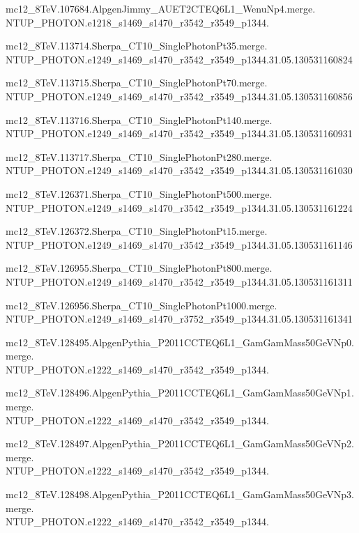 mc12\_8TeV.107684.AlpgenJimmy\_AUET2CTEQ6L1\_WenuNp4.merge. \\NTUP\_PHOTON.e1218\_s1469\_s1470\_r3542\_r3549\_p1344.

mc12\_8TeV.113714.Sherpa\_CT10\_SinglePhotonPt35.merge. \\NTUP\_PHOTON.e1249\_s1469\_s1470\_r3542\_r3549\_p1344.31.05.130531160824

mc12\_8TeV.113715.Sherpa\_CT10\_SinglePhotonPt70.merge. \\NTUP\_PHOTON.e1249\_s1469\_s1470\_r3542\_r3549\_p1344.31.05.130531160856

mc12\_8TeV.113716.Sherpa\_CT10\_SinglePhotonPt140.merge. \\NTUP\_PHOTON.e1249\_s1469\_s1470\_r3542\_r3549\_p1344.31.05.130531160931

mc12\_8TeV.113717.Sherpa\_CT10\_SinglePhotonPt280.merge. \\NTUP\_PHOTON.e1249\_s1469\_s1470\_r3542\_r3549\_p1344.31.05.130531161030

mc12\_8TeV.126371.Sherpa\_CT10\_SinglePhotonPt500.merge. \\NTUP\_PHOTON.e1249\_s1469\_s1470\_r3542\_r3549\_p1344.31.05.130531161224

mc12\_8TeV.126372.Sherpa\_CT10\_SinglePhotonPt15.merge. \\NTUP\_PHOTON.e1249\_s1469\_s1470\_r3542\_r3549\_p1344.31.05.130531161146

mc12\_8TeV.126955.Sherpa\_CT10\_SinglePhotonPt800.merge. \\NTUP\_PHOTON.e1249\_s1469\_s1470\_r3542\_r3549\_p1344.31.05.130531161311

mc12\_8TeV.126956.Sherpa\_CT10\_SinglePhotonPt1000.merge. \\NTUP\_PHOTON.e1249\_s1469\_s1470\_r3752\_r3549\_p1344.31.05.130531161341

mc12\_8TeV.128495.AlpgenPythia\_P2011CCTEQ6L1\_GamGamMass50GeVNp0.merge. \\NTUP\_PHOTON.e1222\_s1469\_s1470\_r3542\_r3549\_p1344.

mc12\_8TeV.128496.AlpgenPythia\_P2011CCTEQ6L1\_GamGamMass50GeVNp1.merge. \\NTUP\_PHOTON.e1222\_s1469\_s1470\_r3542\_r3549\_p1344.

mc12\_8TeV.128497.AlpgenPythia\_P2011CCTEQ6L1\_GamGamMass50GeVNp2.merge. \\NTUP\_PHOTON.e1222\_s1469\_s1470\_r3542\_r3549\_p1344.

mc12\_8TeV.128498.AlpgenPythia\_P2011CCTEQ6L1\_GamGamMass50GeVNp3.merge. \\NTUP\_PHOTON.e1222\_s1469\_s1470\_r3542\_r3549\_p1344.

